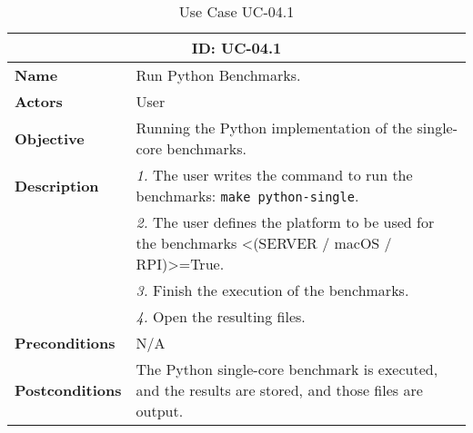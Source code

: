 \begin{table}[H]
    \centering
    \begin{tabular}{l p{10cm}}
        \toprule
        \multicolumn{2}{c}{\textbf{ID: UC-04.1}} \\
        \toprule
        \textbf{Name}                         &  Run Python Benchmarks. \\
        \textbf{Actors}                       &  User \\
        \textbf{Objective}                    &  Running the Python implementation of the single-core benchmarks. \\
        \multirow{1}{*}{\textbf{Description}} & \textsl{1.} The user writes the command to run the benchmarks: \texttt{make python-single}.\\
                                              & \textsl{2.} The user defines the platform to be used for the benchmarks <(SERVER / macOS / RPI)>=True.\\
                                              & \textsl{3.} Finish the execution of the benchmarks.\\
                                              & \textsl{4.} Open the resulting files.\\
        \textbf{Preconditions}                &  N/A \\
        \textbf{Postconditions}               &  The Python single-core benchmark is executed, and the results are stored, and those files are output. \\
    \end{tabular}
    \caption{Use Case UC-04.1}
    \label{tab:uc-04.1}
\end{table}

